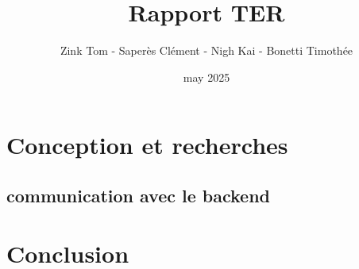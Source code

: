 \documentclass[french,a4paper,10pt]{article}
\title{\color{astral} \sffamily \bfseries Rapport TER}
\author{Zink Tom - Saperès Clément - Nigh Kai - Bonetti Timothée}
\date{may 2025}
\begin{document}
\maketitle

\hypersetup{
    linkcolor=black
}

\tableofcontents

\hypersetup{
    linkcolor=blue
}

\newpage


    

\newpage


\section{Conception et recherches}
    
    
    
    

    
    
    
    
    

    

    

    
    
    
    
        
        
    \subsection{communication avec le backend}

\section{Conclusion}
\end{document}
